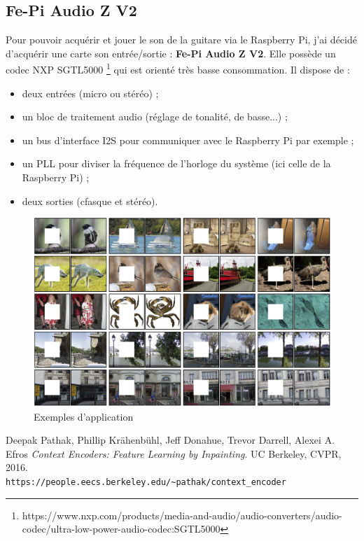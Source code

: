 \documentclass[11pt,a4paper]{article}
\begin{document}
        \subsection{Fe-Pi Audio Z V2}
            Pour pouvoir acquérir et jouer le son de la guitare via le Raspberry Pi, j'ai décidé d'acquérir une carte son entrée/sortie : \textbf{Fe-Pi Audio Z V2}. Elle possède un codec NXP SGTL5000 \footnote{https://www.nxp.com/products/media-and-audio/audio-converters/audio-codec/ultra-low-power-audio-codec:SGTL5000} qui est orienté très basse consommation. Il dispose de : 
            \begin{itemize}[noitemsep]
                \item deux entrées (micro ou stéréo) ;
                \item un bloc de traitement audio (réglage de tonalité, de basse...) ;
                \item un bus d'interface I2S pour communiquer avec le Raspberry Pi par exemple ;
                \item un PLL pour diviser la fréquence de l'horloge du système (ici celle de la Raspberry Pi) ;
                \item deux sorties (cfasque et stéréo).
            \end{itemize}

            \begin{figure}[H]
                \centering
                \includegraphics[scale=0.2]{teaser.jpg} 
                \caption{Exemples d'application}
            \end{figure}



    \newpage
    \listoffigures
    \newpage



    \begin{thebibliography}{9}
        Deepak Pathak, Phillip Krähenbühl, Jeff Donahue, Trevor Darrell, Alexei A. Efros
        \textit{Context Encoders: Feature Learning by Inpainting}. 
        UC Berkeley, CVPR, 2016.
        \\\texttt{https://people.eecs.berkeley.edu/\~{}pathak/context\_encoder}
    \end{thebibliography}
\end{document}
